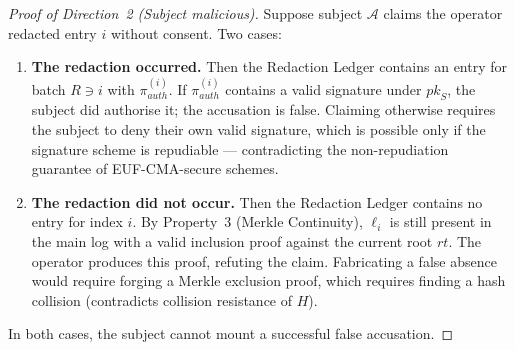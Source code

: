 \begin{proof}[Proof of Direction~2 (Subject malicious)]
Suppose subject $\mathcal{A}$ claims the operator redacted entry $i$
without consent. Two cases:
\begin{enumerate}
  \item \textbf{The redaction occurred.} Then the Redaction Ledger
  contains an entry for batch $R \ni i$ with $\pi_{\mathit{auth}}^{(i)}$.
  If $\pi_{\mathit{auth}}^{(i)}$ contains a valid signature under
  $\mathit{pk}_S$, the subject did authorise it; the accusation is
  false. Claiming otherwise requires the subject to deny their own valid
  signature, which is possible only if the signature scheme is
  repudiable --- contradicting the non-repudiation guarantee of
  EUF-CMA-secure schemes.
  \item \textbf{The redaction did not occur.} Then the Redaction Ledger
  contains no entry for index $i$. By Property~3 (Merkle Continuity),
  $\ell_i$ is still present in the main log with a valid inclusion proof
  against the current root $\mathit{rt}$. The operator produces this
  proof, refuting the claim. Fabricating a false absence would require
  forging a Merkle exclusion proof, which requires finding a hash
  collision (contradicts collision resistance of $H$).
\end{enumerate}
In both cases, the subject cannot mount a successful false accusation.
\end{proof}
